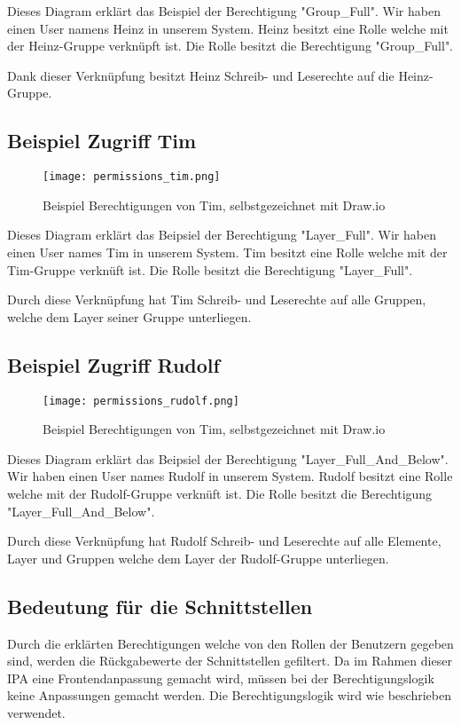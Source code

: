 Dieses Diagram erklärt das Beispiel der Berechtigung "Group\_Full". Wir haben einen User namens Heinz
in unserem System. Heinz besitzt eine Rolle welche mit der Heinz-Gruppe verknüpft ist. Die Rolle besitzt die Berechtigung "Group\_Full".

Dank dieser Verknüpfung besitzt Heinz Schreib- und Leserechte auf die Heinz-Gruppe.

\newpage

\subsection{Beispiel Zugriff Tim}
\begin{figure}[h]
  \centering
  \texttt{[image: permissions\_tim.png]}
  \caption{Beispiel Berechtigungen von Tim, selbstgezeichnet mit Draw.io}
\end{figure}

Dieses Diagram erklärt das Beipsiel der Berechtigung "Layer\_Full".  Wir haben einen User names Tim in unserem System.
Tim besitzt eine Rolle welche mit der Tim-Gruppe verknüft ist. Die Rolle besitzt die Berechtigung "Layer\_Full".

Durch diese Verknüpfung hat Tim Schreib- und Leserechte auf alle Gruppen, welche dem Layer seiner Gruppe unterliegen. 

\newpage

\subsection{Beispiel Zugriff Rudolf}
\begin{figure}[h]
  \centering
  \texttt{[image: permissions\_rudolf.png]}
  \caption{Beispiel Berechtigungen von Tim, selbstgezeichnet mit Draw.io}
\end{figure}

Dieses Diagram erklärt das Beipsiel der Berechtigung "Layer\_Full\_And\_Below".  Wir haben einen User names Rudolf in unserem System.
Rudolf besitzt eine Rolle welche mit der Rudolf-Gruppe verknüft ist. Die Rolle besitzt die Berechtigung "Layer\_Full\_And\_Below".

Durch diese Verknüpfung hat Rudolf Schreib- und Leserechte auf alle Elemente, Layer und Gruppen welche dem Layer der Rudolf-Gruppe unterliegen.

\subsection{Bedeutung für die Schnittstellen}
Durch die erklärten Berechtigungen welche von den Rollen der Benutzern gegeben sind, werden die Rückgabewerte der Schnittstellen gefiltert.
Da im Rahmen dieser IPA eine Frontendanpassung gemacht wird, müssen bei der Berechtigungslogik keine Anpassungen gemacht werden. Die Berechtigungslogik wird
wie beschrieben verwendet.

